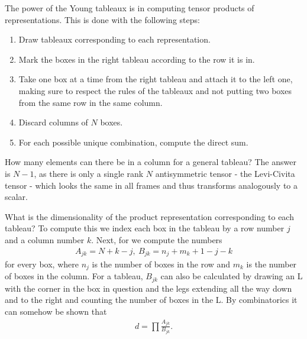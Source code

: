 The power of the Young tableaux is in computing tensor products of representations. This is done with the following steps:
\begin{enumerate}
	\item Draw tableaux corresponding to each representation.
	\item Mark the boxes in the right tableau according to the row it is in.
	\item Take one box at a time from the right tableau and attach it to the left one, making sure to respect the rules of the tableaux and not putting two boxes from the same row in the same column.
	\item Discard columns of $N$ boxes.
	\item For each possible unique combination, compute the direct sum.
\end{enumerate}

How many elements can there be in a column for a general  tableau? The answer is $N - 1$, as there is only a single rank $N$ antisymmetric tensor - the Levi-Civita tensor - which looks the same in all frames and thus transforms analogously to a scalar.

What is the dimensionality of the product representation corresponding to each tableau? To compute this we index each box in the tableau by a row number $j$ and a column number $k$. Next, for  we compute the numbers
\begin{align*}
	A_{jk} = N + k - j,\ B_{jk} = n_{j} + m_{k}  + 1 - j - k
\end{align*}
for every box, where $n_{j}$ is the number of boxes in the row and $m_{k}$ is the number of boxes in the column. For a tableau, $B_{jk}$ can also be calculated by drawing an L with the corner in the box in question and the legs extending all the way down and to the right and counting the number of boxes in the L. By combinatorics it can somehow be shown that
\begin{align*}
	d = \prod\frac{A_{jk}}{B_{jk}}.
\end{align*}

